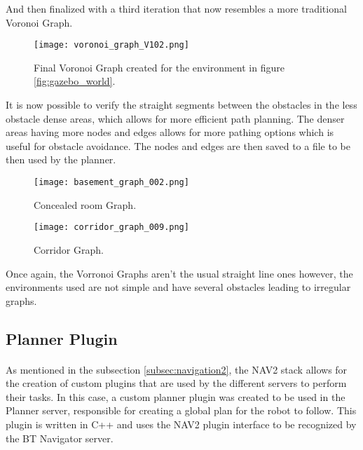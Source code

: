And then finalized with a third iteration that now resembles a more 
traditional Voronoi Graph.
\begin{figure}[h]
    \centering
    \texttt{[image: voronoi\_graph\_V102.png]}
    \caption{Final Voronoi Graph created for the environment in figure \ref{fig:gazebo_world}.}
    \label{fig:voronoi_graph3}
\end{figure}

It is now possible to verify the straight segments between the obstacles in the 
less obstacle dense areas, which allows for more efficient path planning. The denser areas 
having more nodes and edges allows for more pathing options which is useful 
for obstacle avoidance. The nodes and edges are then saved to a file to be 
then used by the planner.
\begin{figure}[h]
    \centering
    \texttt{[image: basement\_graph\_002.png]}
    \caption{Concealed room Graph.}
    \label{fig:basement_graph_002}
\end{figure}
\begin{figure}[h]
    \centering
    \texttt{[image: corridor\_graph\_009.png]}
    \caption{Corridor Graph.}
    \label{fig:corridor_graph_009}
\end{figure}
\clearpage

Once again, the Vorronoi Graphs aren't the usual straight line ones however, the environments 
used are not simple and have several obstacles leading to irregular graphs.

\subsection{Planner Plugin}
\label{subsec:planner_plugin}
\paragraph{}As mentioned in the subsection \ref{subsec:navigation2}, the \gls{NAV2} stack allows for the creation of custom plugins that are 
used by the different servers to perform their tasks. In this case, a custom planner plugin was 
created to be used in the Planner server, responsible for creating a global plan 
for the robot to follow. This plugin is written in C++ and uses the 
\gls{NAV2} plugin interface to be recognized by the BT Navigator server.

